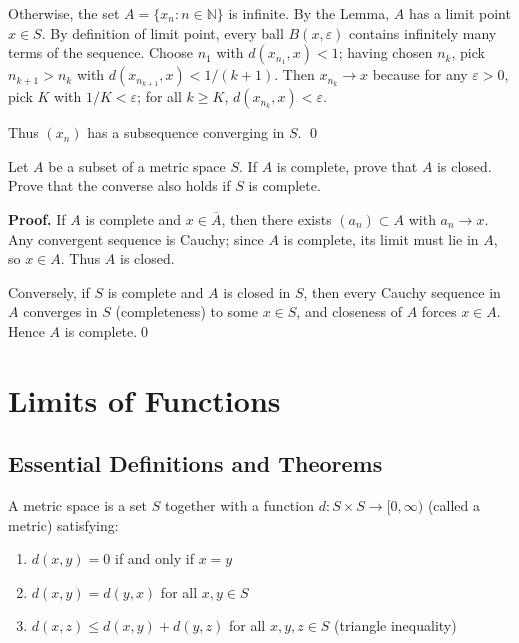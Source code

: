 Otherwise, the set \(A=\{x_n:n\in\mathbb{N}\}\) is infinite. By the Lemma, \(A\) has a limit point \(x\in S\). By definition of limit point, every ball \(B(x,\varepsilon)\) contains infinitely many terms of the sequence. Choose \(n_1\) with \(d(x_{n_1},x)<1\); having chosen \(n_k\), pick \(n_{k+1}>n_k\) with \(d(x_{n_{k+1}},x)<1/(k+1)\). Then \(x_{n_k}\to x\) because for any \(\varepsilon>0\), pick \(K\) with \(1/K<\varepsilon\); for all \(k\ge K\), \(d(x_{n_k},x)<\varepsilon\).

Thus \((x_n)\) has a subsequence converging in \(S\). \qed
\medskip



\begin{problembox}
Let $A$ be a subset of a metric space $S$. If $A$ is complete, prove that $A$ is closed. Prove that the converse also holds if $S$ is complete.
\end{problembox}

\noindent\textbf{Proof.}
If $A$ is complete and $x\in\overline{A}$, then there exists $(a_n)\subset A$ with $a_n\to x$. Any convergent sequence is Cauchy; since $A$ is complete, its limit must lie in $A$, so $x\in A$. Thus $A$ is closed.

Conversely, if $S$ is complete and $A$ is closed in $S$, then every Cauchy sequence in $A$ converges in $S$ (completeness) to some $x\in S$, and closeness of $A$ forces $x\in A$. Hence $A$ is complete.\qed
\medskip

\section{Limits of Functions}

\subsection*{Essential Definitions and Theorems}

\begin{definition}
A metric space is a set $S$ together with a function $d: S \times S \to [0,\infty)$ (called a metric) satisfying:
\begin{enumerate}
\item $d(x,y) = 0$ if and only if $x = y$
\item $d(x,y) = d(y,x)$ for all $x,y \in S$
\item $d(x,z) \leq d(x,y) + d(y,z)$ for all $x,y,z \in S$ (triangle inequality)
\end{enumerate}
\end{definition}

